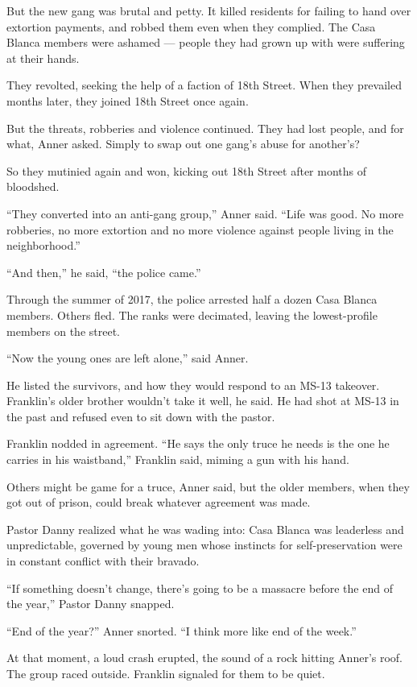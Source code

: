 But the new gang was brutal and petty. It killed residents for failing
to hand over extortion payments, and robbed them even when they
complied. The Casa Blanca members were ashamed --- people they had grown
up with were suffering at their hands.

They revolted, seeking the help of a faction of 18th Street. When they
prevailed months later, they joined 18th Street once again.

But the threats, robberies and violence continued. They had lost people,
and for what, Anner asked. Simply to swap out one gang's abuse for
another's?

So they mutinied again and won, kicking out 18th Street after months of
bloodshed.

``They converted into an anti-gang group,'' Anner said. ``Life was good.
No more robberies, no more extortion and no more violence against people
living in the neighborhood.''

``And then,'' he said, ``the police came.''

Through the summer of 2017, the police arrested half a dozen Casa Blanca
members. Others fled. The ranks were decimated, leaving the
lowest-profile members on the street.

``Now the young ones are left alone,'' said Anner.

He listed the survivors, and how they would respond to an MS-13
takeover. Franklin's older brother wouldn't take it well, he said. He
had shot at MS-13 in the past and refused even to sit down with the
pastor.

Franklin nodded in agreement. ``He says the only truce he needs is the
one he carries in his waistband,'' Franklin said, miming a gun with his
hand.

Others might be game for a truce, Anner said, but the older members,
when they got out of prison, could break whatever agreement was made.

Pastor Danny realized what he was wading into: Casa Blanca was
leaderless and unpredictable, governed by young men whose instincts for
self-preservation were in constant conflict with their bravado.

``If something doesn't change, there's going to be a massacre before the
end of the year,'' Pastor Danny snapped.

``End of the year?'' Anner snorted. ``I think more like end of the
week.''

At that moment, a loud crash erupted, the sound of a rock hitting
Anner's roof. The group raced outside. Franklin signaled for them to be
quiet.


